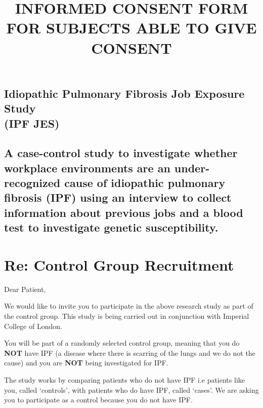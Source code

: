 \documentclass[a4paper,10pt]{article}
\begin{document}
 \newpage\title{\bf INFORMED CONSENT FORM FOR SUBJECTS ABLE TO GIVE CONSENT}
 \date{}
 
 
 \pagestyle{fancy}
 
 

 \begin{centering} 
 \section*{Idiopathic Pulmonary Fibrosis Job Exposure Study \\ (IPF JES)}
 \subsection*{A case-control study to investigate whether workplace environments are an under-recognized cause of idiopathic pulmonary fibrosis (IPF) using an interview to collect information about previous jobs and a blood test to investigate genetic susceptibility.}
 \end{centering}

 \section*{Re: Control Group Recruitment}

Dear Patient,

\vspace{0.6cm}

We would like to invite you to participate in the above research study as part of the control group. This study is being carried out in conjunction with Imperial College of London. 

You will be part of a randomly selected control group, meaning that you do \textbf{NOT} have IPF (a disease where there is scarring of the lungs and we do not the cause) and you are \textbf{NOT} being investigated for IPF. 

The study works by comparing patients who do not have IPF i.e patients like you, called ‘controls’, with patients who do have IPF, called ‘cases’. We are asking you to participate as a control because you do not have IPF.
\end{document}
